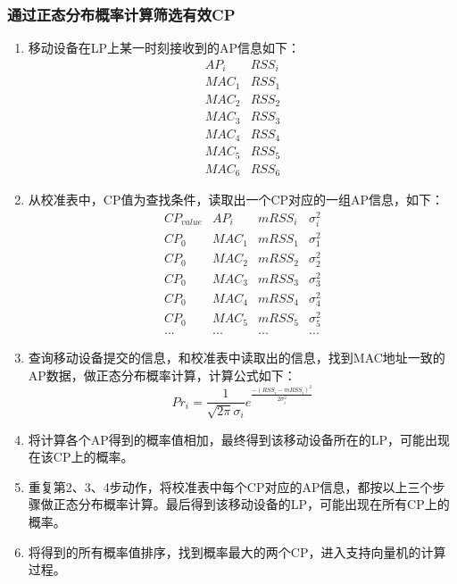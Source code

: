 \documentclass[UTF8, twocolumn ]{ctexart}
\begin{document}
\subsubsection{通过正态分布概率计算筛选有效CP}
\begin{enumerate}
\item 移动设备在LP上某一时刻接收到的AP信息如下：
\begin{displaymath}
\begin{array}{c|c}
AP_{i} & RSS_{i} \\ \hline
MAC_{1} & RSS_{1} \\
MAC_{2} & RSS_{2} \\
MAC_{3} & RSS_{3} \\
MAC_{4} & RSS_{4} \\
MAC_{5} & RSS_{5} \\
MAC_{6} & RSS_{6}
\end{array}
\end{displaymath}
\item 从校准表中，CP值为查找条件，读取出一个CP对应的一组AP信息，如下：
\begin{displaymath}
\begin{array}{c|c|c|c}
CP_{value} & AP_{i} & mRSS_{i} & \sigma^{2}_{i} \\ \hline
CP_{0} & MAC_{1} & mRSS_{1} & \sigma^{2}_{1} \\
CP_{0} & MAC_{2} & mRSS_{2} & \sigma^{2}_{2} \\
CP_{0} & MAC_{3} & mRSS_{3} & \sigma^{2}_{3} \\
CP_{0} & MAC_{4} & mRSS_{4} & \sigma^{2}_{4} \\
CP_{0} & MAC_{5} & mRSS_{5} & \sigma^{2}_{5} \\
... & ... & ... & ...
\end{array}
\end{displaymath}
\item 查询移动设备提交的信息，和校准表中读取出的信息，找到MAC地址一致的AP数据，做正态分布概率计算，计算公式如下：
\begin{displaymath}
Pr_{i}=\frac{1}{\sqrt{2\pi}\sigma_{i}}e^{\frac{-(RSS_{i}-mRSS_{i})^{2}}{2\sigma_{i}^{2}}}
\end{displaymath}
\item 将计算各个AP得到的概率值相加，最终得到该移动设备所在的LP，可能出现在该CP上的概率。
\item 重复第2、3、4步动作，将校准表中每个CP对应的AP信息，都按以上三个步骤做正态分布概率计算。最后得到该移动设备的LP，可能出现在所有CP上的概率。
\item 将得到的所有概率值排序，找到概率最大的两个CP，进入支持向量机的计算过程。
\end{enumerate}
\end{document}
